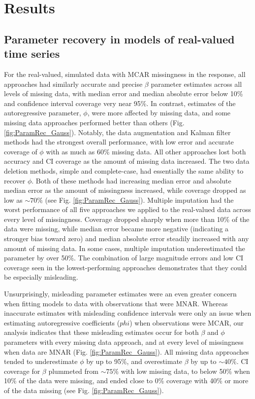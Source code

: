 \documentclass{article}
\begin{document}

\section*{Results}

\subsection*{Parameter recovery in models of real-valued time series}

For the real-valued, simulated data with MCAR missingness in the response, all approaches had similarly accurate and precise $\beta$ parameter estimates across all levels of missing data, with median error and median absolute error below 10\% and confidence interval coverage very near 95\%. In contrast, estimates of the autoregressive parameter, $\phi$, were more affected by missing data, and some missing data approaches performed better than others (Fig. \ref{fig:ParamRec_Gauss}). Notably, the data augmentation and Kalman filter methods had the strongest overall performance, with low error and accurate coverage of $\phi$ with as much as 60\% missing data. All other approaches lost both accuracy and CI coverage as the amount of missing data increased. The two data deletion methods, simple and complete-case, had essentially the same ability to recover $\phi$. Both of these methods had increasing median error and absolute median error as the amount of missingness increased, while coverage dropped as low as $\sim70\%$ (see Fig. \ref{fig:ParamRec_Gauss}). Multiple imputation had the worst performance of all five approaches we applied to the real-valued data across every level of missingness. Coverage dropped sharply when more than 10\% of the data were missing, while median error became more negative (indicating a stronger bias toward zero) and median absolute error steadily increased with any amount of missing data. In some cases, multiple imputation underestimated the parameter by over 50\%. The combination of large magnitude errors and low CI coverage seen in the lowest-performing approaches demonstrates that they could be especially misleading. 

Unsurprisingly, misleading parameter estimates were an even greater concern when fitting models to data with observations that were MNAR.  Whereas inaccurate estimates with misleading confidence intervals were only an issue when estimating autoregressive coefficients ($phi$) when observations were MCAR, our analysis indicates that these misleading estimates occur for both $\beta$ and $\phi$ parameters with every missing data approach, and at every level of missingness when data are MNAR (Fig. \ref{fig:ParamRec_Gauss}). All missing data approaches tended to underestimate $\phi$ by up to 95\%, and overestimate $\beta$ by up to $\sim40\%$.  CI coverage for $\beta$ plummeted from $\sim75\%$ with low missing data, to below 50\% when 10\% of the data were missing, and ended close to 0\% coverage with 40\% or more of the data missing (see Fig. \ref{fig:ParamRec_Gauss}). 
\end{document}
